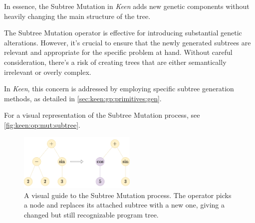     In essence, the Subtree Mutation in \textit{Keen} adds new genetic components without heavily changing the main 
    structure of the tree.

    \begin{remark}
        The Subtree Mutation operator is effective for introducing substantial genetic alterations. However, it's 
        crucial to ensure that the newly generated subtrees are relevant and appropriate for the specific problem at 
        hand. Without careful consideration, there's a risk of creating trees that are either semantically irrelevant or 
        overly complex.

        In \textit{Keen}, this concern is addressed by employing specific subtree generation methods, as detailed in \vref{sec:keen:gp:primitives:gen}.
    \end{remark}

    For a visual representation of the Subtree Mutation process, see \vref{fig:keen:op:mut:subtree}.

    \begin{figure}[ht!]
        \centering
        \includegraphics[width=0.5\textwidth]{img/keen/STM.png}
        \caption{
            A visual guide to the Subtree Mutation process. The operator picks a node and replaces its attached subtree 
            with a new one, giving a changed but still recognizable program tree.
        }
        \label{fig:keen:op:mut:subtree}
    \end{figure}
